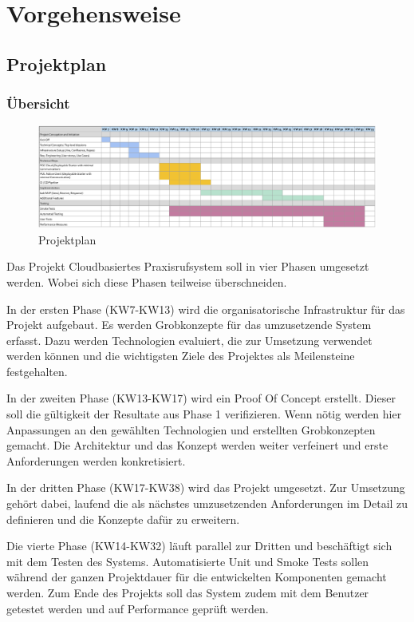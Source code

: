 \section{Vorgehensweise}\label{sec:vorgehensweise}

\subsection{Projektplan}\label{subsec:projektplan}

\subsubsection*{Übersicht}
\begin{figure}[h]
    \label{fig:projectPlan}
    \includegraphics[width=\linewidth]{graphics/Projectplanning}\caption[Projektplan]{Projektplan}
\end{figure}

Das Projekt Cloudbasiertes Praxisrufsystem soll in vier Phasen umgesetzt werden.
Wobei sich diese Phasen teilweise überschneiden.

In der ersten Phase (KW7-KW13) wird die organisatorische Infrastruktur für das Projekt aufgebaut.
Es werden Grobkonzepte für das umzusetzende System erfasst.
Dazu werden Technologien evaluiert, die zur Umsetzung verwendet werden können und
die wichtigsten Ziele des Projektes als Meilensteine festgehalten.

In der zweiten Phase (KW13-KW17) wird ein Proof Of Concept erstellt.
Dieser soll die gültigkeit der Resultate aus Phase 1 verifizieren.
Wenn nötig werden hier Anpassungen an den gewählten Technologien und erstellten Grobkonzepten gemacht.
Die Architektur und das Konzept werden weiter verfeinert und erste Anforderungen werden konkretisiert.

In der dritten Phase (KW17-KW38) wird das Projekt umgesetzt.
Zur Umsetzung gehört dabei, laufend die als nächstes umzusetzenden Anforderungen im Detail zu definieren und die Konzepte dafür zu erweitern.

Die vierte Phase (KW14-KW32) läuft parallel zur Dritten und beschäftigt sich mit dem Testen des Systems.
Automatisierte Unit und Smoke Tests sollen während der ganzen Projektdauer für die entwickelten Komponenten gemacht werden.
Zum Ende des Projekts soll das System zudem mit dem Benutzer getestet werden und auf Performance geprüft werden.

